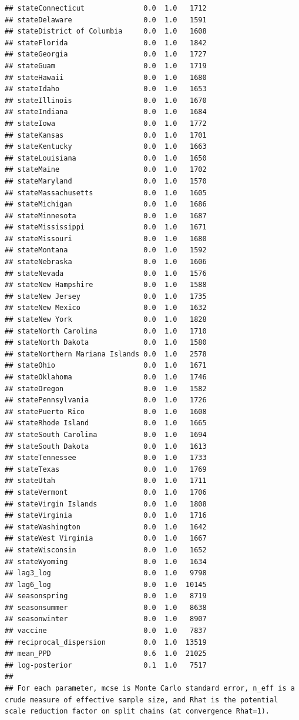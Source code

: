 \documentclass[
]{book}
\begin{document}
\begin{verbatim}
## stateConnecticut              0.0  1.0   1712
## stateDelaware                 0.0  1.0   1591
## stateDistrict of Columbia     0.0  1.0   1608
## stateFlorida                  0.0  1.0   1842
## stateGeorgia                  0.0  1.0   1727
## stateGuam                     0.0  1.0   1719
## stateHawaii                   0.0  1.0   1680
## stateIdaho                    0.0  1.0   1653
## stateIllinois                 0.0  1.0   1670
## stateIndiana                  0.0  1.0   1684
## stateIowa                     0.0  1.0   1772
## stateKansas                   0.0  1.0   1701
## stateKentucky                 0.0  1.0   1663
## stateLouisiana                0.0  1.0   1650
## stateMaine                    0.0  1.0   1702
## stateMaryland                 0.0  1.0   1570
## stateMassachusetts            0.0  1.0   1605
## stateMichigan                 0.0  1.0   1686
## stateMinnesota                0.0  1.0   1687
## stateMississippi              0.0  1.0   1671
## stateMissouri                 0.0  1.0   1680
## stateMontana                  0.0  1.0   1592
## stateNebraska                 0.0  1.0   1606
## stateNevada                   0.0  1.0   1576
## stateNew Hampshire            0.0  1.0   1588
## stateNew Jersey               0.0  1.0   1735
## stateNew Mexico               0.0  1.0   1632
## stateNew York                 0.0  1.0   1828
## stateNorth Carolina           0.0  1.0   1710
## stateNorth Dakota             0.0  1.0   1580
## stateNorthern Mariana Islands 0.0  1.0   2578
## stateOhio                     0.0  1.0   1671
## stateOklahoma                 0.0  1.0   1746
## stateOregon                   0.0  1.0   1582
## statePennsylvania             0.0  1.0   1726
## statePuerto Rico              0.0  1.0   1608
## stateRhode Island             0.0  1.0   1665
## stateSouth Carolina           0.0  1.0   1694
## stateSouth Dakota             0.0  1.0   1613
## stateTennessee                0.0  1.0   1733
## stateTexas                    0.0  1.0   1769
## stateUtah                     0.0  1.0   1711
## stateVermont                  0.0  1.0   1706
## stateVirgin Islands           0.0  1.0   1808
## stateVirginia                 0.0  1.0   1716
## stateWashington               0.0  1.0   1642
## stateWest Virginia            0.0  1.0   1667
## stateWisconsin                0.0  1.0   1652
## stateWyoming                  0.0  1.0   1634
## lag3_log                      0.0  1.0   9798
## lag6_log                      0.0  1.0  10145
## seasonspring                  0.0  1.0   8719
## seasonsummer                  0.0  1.0   8638
## seasonwinter                  0.0  1.0   8907
## vaccine                       0.0  1.0   7837
## reciprocal_dispersion         0.0  1.0  13519
## mean_PPD                      0.6  1.0  21025
## log-posterior                 0.1  1.0   7517
## 
## For each parameter, mcse is Monte Carlo standard error, n_eff is a crude measure of effective sample size, and Rhat is the potential scale reduction factor on split chains (at convergence Rhat=1).
\end{verbatim}
\end{document}
